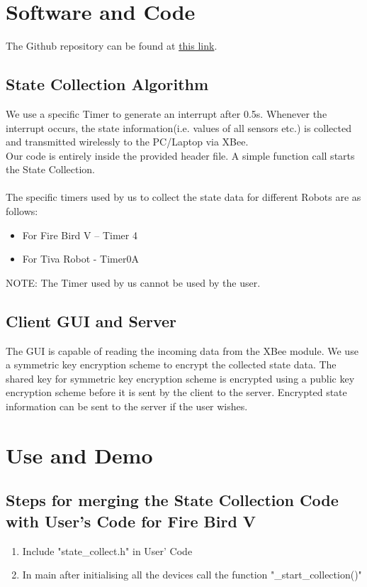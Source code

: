 \documentclass[a4paper,12pt,oneside]{book}
\begin{document}
\newpage
\section{Software and Code}
The Github repository can be found at 
 \href{https://github.com/eYSIP-2016/Robot_State_Collector/tree/master/code}{this link}. 
\subsection{State Collection Algorithm}
We use a specific Timer to generate an interrupt after 0.5s. Whenever the interrupt occurs, the state information(i.e. values of all sensors etc.) is collected and transmitted wirelessly to the PC/Laptop via XBee.\\
    Our code is entirely inside the provided header file. A simple function call starts the State Collection.\\
\\
The specific timers used by us to collect the state data for different Robots are as follows:
\begin{itemize}
\item For Fire Bird V -- Timer 4
\item For Tiva Robot - Timer0A
\end{itemize}

NOTE: The Timer used by us cannot be used by the user. 

\subsection{Client GUI and Server}

The GUI is capable of reading the incoming data from the XBee module. We use a symmetric key encryption scheme to encrypt the collected state data. The shared key for symmetric key encryption scheme is encrypted using a public key encryption scheme before it is sent by the client to the server. Encrypted state information can be sent to the server if the user wishes.

\newpage

\section{Use and Demo}

\subsection{Steps for merging the State Collection Code with User's Code for Fire Bird V}
\begin{enumerate}

\item Include "state\_collect.h" in User' Code

\item In main after initialising all the devices call the function  "\_start\_collection()"

\end{enumerate}
\end{document}
